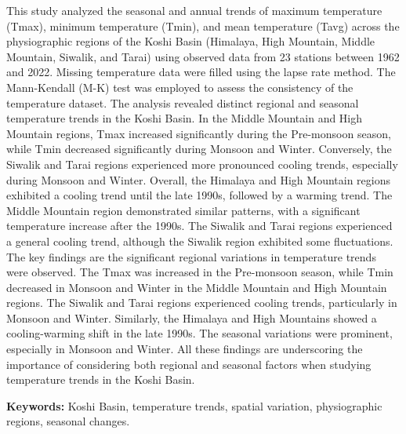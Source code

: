 

This study analyzed the seasonal and annual trends of maximum temperature (Tmax), minimum temperature (Tmin), and mean temperature (Tavg) across the physiographic regions of the Koshi Basin (Himalaya, High Mountain, Middle Mountain, Siwalik, and Tarai) using observed data from 23 stations between 1962 and 2022. Missing temperature data were filled using the lapse rate method. The Mann-Kendall (M-K) test was employed to assess the consistency of the temperature dataset. The analysis revealed distinct regional and seasonal temperature trends in the Koshi Basin. In the Middle Mountain and High Mountain regions, Tmax increased significantly during the Pre-monsoon season, while Tmin decreased significantly during Monsoon and Winter. Conversely, the Siwalik and Tarai regions experienced more pronounced cooling trends, especially during Monsoon and Winter. Overall, the Himalaya and High Mountain regions exhibited a cooling trend until the late 1990s, followed by a warming trend. The Middle Mountain region demonstrated similar patterns, with a significant temperature increase after the 1990s. The Siwalik and Tarai regions experienced a general cooling trend, although the Siwalik region exhibited some fluctuations. The key findings are the significant regional variations in temperature trends were observed. The Tmax was increased in the Pre-monsoon season, while Tmin decreased in Monsoon and Winter in the Middle Mountain and High Mountain regions. The Siwalik and Tarai regions experienced cooling trends, particularly in Monsoon and Winter. Similarly, the Himalaya and High Mountains showed a cooling-warming shift in the late 1990s. The seasonal variations were prominent, especially in Monsoon and Winter. All these findings are underscoring the importance of considering both regional and seasonal factors when studying temperature trends in the Koshi Basin.



\textbf{Keywords:} Koshi Basin, temperature trends, spatial variation, physiographic regions, seasonal changes.

